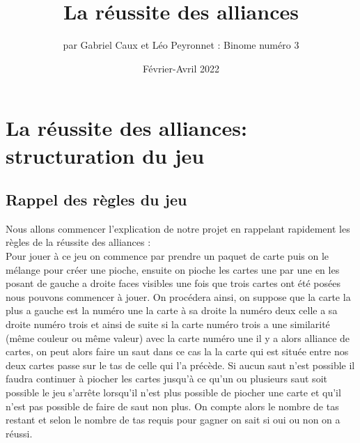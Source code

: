 \documentclass[10pt,a4paper,french,titlepage]{article}
\author{par Gabriel Caux et Léo Peyronnet : Binome numéro 3}
\title{La réussite des alliances}
\date{Février-Avril 2022}
\begin{document}
\maketitle
\tableofcontents
\section{La réussite des alliances: structuration du jeu}
\subsection{Rappel des règles du jeu}
Nous allons commencer l'explication de notre projet en rappelant rapidement les règles de la réussite des alliances :\\
Pour jouer à ce jeu on commence par prendre un paquet de carte puis on le mélange pour créer une pioche, ensuite on pioche les cartes une par une en les posant de gauche a droite faces visibles une fois que trois cartes ont été posées nous pouvons commencer à jouer. On procédera ainsi, on suppose que la carte la plus a gauche est la numéro une la carte à sa droite la numéro deux celle a sa droite numéro trois et ainsi de suite si la carte numéro trois a une  similarité (même couleur ou même valeur) avec la carte numéro une il y a alors alliance de cartes, on peut alors faire un saut dans ce cas la la carte qui est située entre nos deux cartes passe sur le tas de celle qui l'a précède. Si aucun saut n'est possible il faudra continuer à piocher les cartes jusqu'à ce qu'un ou plusieurs saut soit possible le jeu s'arrête lorsqu'il n'est plus possible de piocher une carte et qu'il n'est pas possible de faire de saut non plus. On compte alors le nombre de tas restant et selon le nombre de tas requis pour gagner on sait si oui ou non on a réussi.\\\\\\\\\\\\
\end{document}
